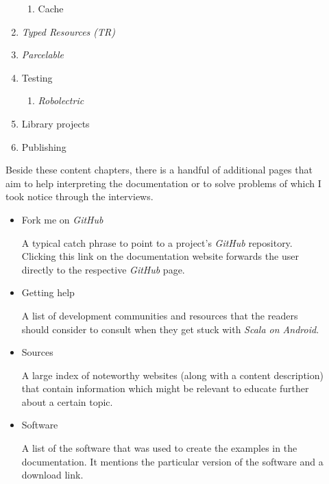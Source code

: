 \begin{description}
\begin{enumerate}
\begin{enumerate}
			\item Cache

		\end{enumerate}

		\item \textit{Typed Resources (TR)}

		\item \textit{Parcelable}

		\item Testing

		\begin{enumerate}

			\item \textit{Robolectric}

		\end{enumerate}

		\item Library projects

		\item Publishing

	\end{enumerate}

	Beside these content chapters, there is a handful of additional pages that aim to help interpreting the documentation or to solve problems of which I took notice through the interviews.

	\begin{itemize}

		\item Fork me on \textit{GitHub}

		A typical catch phrase to point to a project's \textit{GitHub} repository. Clicking this link on the documentation website forwards the user directly to the respective \textit{GitHub} page.

		\item Getting help

		A list of development communities and resources that the readers should consider to consult when they get stuck with \textit{Scala on Android}.

		\item Sources

		A large index of noteworthy websites (along with a content description) that contain information which might be relevant to educate further about a certain topic.

		\item Software

		A list of the software that was used to create the examples in the documentation. It mentions the particular version of the software and a download link.


\end{itemize}
\end{description}
